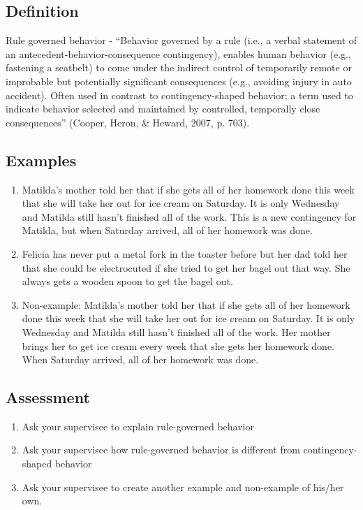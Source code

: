 \subsection{Definition} 
Rule governed behavior - ``Behavior governed by a rule (i.e., a verbal statement of an antecedent-behavior-consequence contingency), enables human behavior (e.g., fastening a seatbelt) to come under the indirect control of temporarily remote or improbable but potentially significant consequences (e.g., avoiding injury in auto accident). Often used in contrast to contingency-shaped behavior; a term used to indicate behavior selected and maintained by controlled, temporally close consequences'' (Cooper, Heron, \& Heward, 2007, p. 703).
%
\subsection{Examples}
\begin{enumerate}
\item Matilda's mother told her that if she gets all of her homework done this week that she will take her out for ice cream on Saturday. It is only Wednesday and Matilda still hasn't finished all of the work. This is a new contingency for Matilda, but when Saturday arrived, all of her homework was done.
\item Felicia has never put a metal fork in the toaster before but her dad told her that she could be electrocuted if she tried to get her bagel out that way. She always gets a wooden spoon to get the bagel out.
\item Non-example: Matilda's mother told her that if she gets all of her homework done this week that she will take her out for ice cream on Saturday. It is only Wednesday and Matilda still hasn't finished all of the work. Her mother brings her to get ice cream every week that she gets her homework done. When Saturday arrived, all of her homework was done.
%
\end{enumerate}
%
\subsection{Assessment}
\begin{enumerate}
\item Ask your supervisee to explain rule-governed behavior 
\item Ask your supervisee how rule-governed behavior is different from contingency-shaped behavior
\item Ask your supervisee to create another example and non-example of his/her own.  
\end{enumerate}
%
